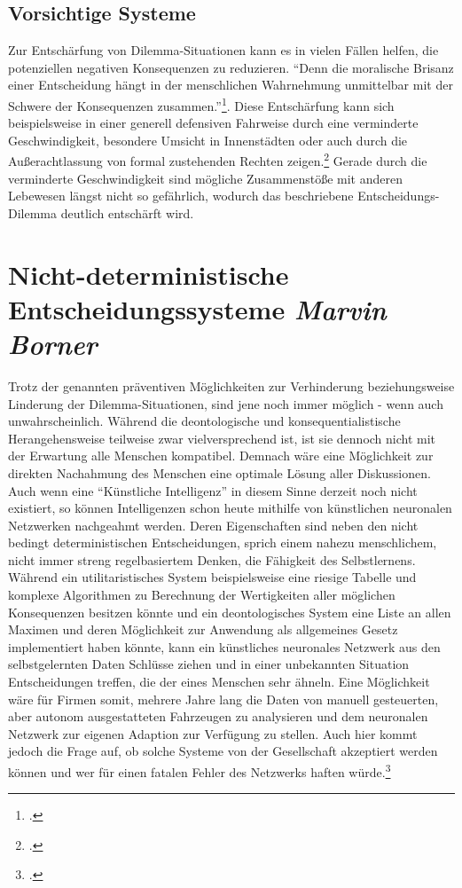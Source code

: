 \documentclass[a4paper, 12pt, openany]{book}
\newcommand\Section[2]{\section[#1 {\scriptsize\itshape#2}]{#1 \footnotesize\itshape#2}}
\begin{document}
            \subsection{Vorsichtige Systeme}
                Zur Entschärfung von Dilemma-Situationen kann es in vielen Fällen helfen, die potenziellen negativen Konsequenzen zu reduzieren. \enquote{Denn die moralische Brisanz einer Entscheidung hängt in der menschlichen Wahrnehmung unmittelbar mit der Schwere der Konsequenzen zusammen.}\footcite[225]{scholz2016autonomes}. Diese Entschärfung kann sich beispielsweise in einer generell defensiven Fahrweise durch eine verminderte Geschwindigkeit, besondere Umsicht in Innenstädten oder auch durch die Außerachtlassung von formal zustehenden Rechten zeigen.\footcite[225]{scholz2016autonomes} Gerade durch die verminderte Geschwindigkeit sind mögliche Zusammenstöße mit anderen Lebewesen längst nicht so gefährlich, wodurch das beschriebene Entscheidungs-Dilemma deutlich entschärft wird.
            
        \Section{Nicht-deterministische Entscheidungssysteme}{Marvin Borner}
            Trotz der genannten präventiven Möglichkeiten zur Verhinderung beziehungsweise Linderung der Dilemma-Situationen, sind jene noch immer möglich - wenn auch unwahrscheinlich. Während die deontologische und konsequentialistische Herangehensweise teilweise zwar vielversprechend ist, ist sie dennoch nicht mit der Erwartung alle Menschen kompatibel. Demnach wäre eine Möglichkeit zur direkten Nachahmung des Menschen eine optimale Lösung aller Diskussionen. Auch wenn eine \enquote{Künstliche Intelligenz} in diesem Sinne derzeit noch nicht existiert, so können Intelligenzen schon heute mithilfe von künstlichen neuronalen Netzwerken nachgeahmt werden. Deren Eigenschaften sind neben den nicht bedingt deterministischen Entscheidungen, sprich einem nahezu menschlichem, nicht immer streng regelbasiertem Denken, die Fähigkeit des Selbstlernens. Während ein utilitaristisches System beispielsweise eine riesige Tabelle und komplexe Algorithmen zu Berechnung der Wertigkeiten aller möglichen Konsequenzen besitzen könnte und ein deontologisches System eine Liste an allen Maximen und deren Möglichkeit zur Anwendung als allgemeines Gesetz implementiert haben könnte, kann ein künstliches neuronales Netzwerk aus den selbstgelernten Daten Schlüsse ziehen und in einer unbekannten Situation Entscheidungen treffen, die der eines Menschen sehr ähneln. Eine Möglichkeit wäre für Firmen somit, mehrere Jahre lang die Daten von manuell gesteuerten, aber autonom ausgestatteten Fahrzeugen zu analysieren und dem neuronalen Netzwerk zur eigenen Adaption zur Verfügung zu stellen. Auch hier kommt jedoch die Frage auf, ob solche Systeme von der Gesellschaft akzeptiert werden können und wer für einen fatalen Fehler des Netzwerks haften würde.\footcite[227]{scholz2016autonomes}
        
\end{document}
